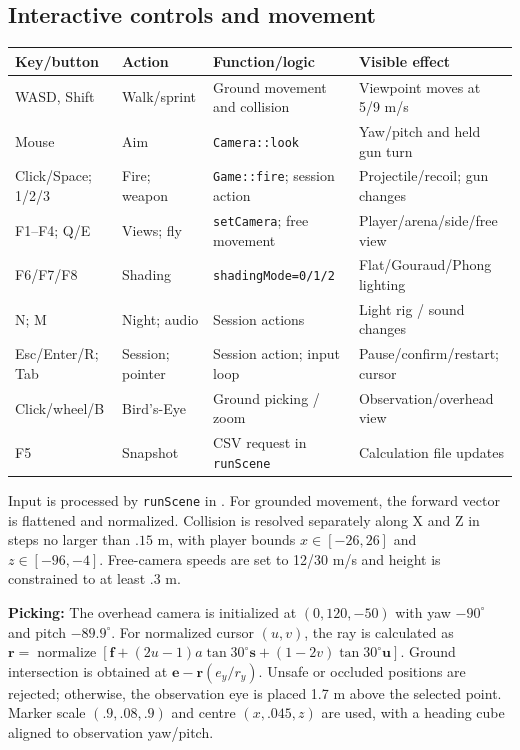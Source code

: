 \subsection{Interactive controls and movement}
\begin{center}\begin{tabularx}{\linewidth}{L{.17\linewidth}L{.17\linewidth}XX}\toprule
Key/button & Action & Function/logic & Visible effect \\\midrule
WASD, Shift & Walk/sprint & Ground movement and collision & Viewpoint moves at 5/9 m/s\\
Mouse & Aim & \texttt{Camera::look} & Yaw/pitch and held gun turn\\
Click/Space; 1/2/3 & Fire; weapon & \texttt{Game::fire}; session action & Projectile/recoil; gun changes\\
F1--F4; Q/E & Views; fly & \texttt{setCamera}; free movement & Player/arena/side/free view\\
F6/F7/F8 & Shading & \texttt{shadingMode=0/1/2} & Flat/Gouraud/Phong lighting\\
N; M & Night; audio & Session actions & Light rig / sound changes\\
Esc/Enter/R; Tab & Session; pointer & Session action; input loop & Pause/confirm/restart; cursor\\
Click/wheel/B & Bird's-Eye & Ground picking / zoom & Observation/overhead view\\
F5 & Snapshot & CSV request in \texttt{runScene} & Calculation file updates\\\bottomrule
\end{tabularx}\end{center}
Input is processed by \texttt{runScene} in . For grounded movement, the forward vector is flattened and normalized. Collision is resolved separately along X and Z in steps no larger than $.15$ m, with player bounds $x\in[-26,26]$ and $z\in[-96,-4]$. Free-camera speeds are set to 12/30 m/s and height is constrained to at least $.3$ m.

\textbf{Picking:} The overhead camera is initialized at $(0,120,-50)$ with yaw $-90^\circ$ and pitch $-89.9^\circ$. For normalized cursor $(u,v)$, the ray is calculated as $\mathbf r=\operatorname{normalize}[\mathbf f+(2u-1)a\tan30^\circ\mathbf s+(1-2v)\tan30^\circ\mathbf u]$. Ground intersection is obtained at $\mathbf e-\mathbf r(e_y/r_y)$. Unsafe or occluded positions are rejected; otherwise, the observation eye is placed 1.7 m above the selected point. Marker scale $(.9,.08,.9)$ and centre $(x,.045,z)$ are used, with a heading cube aligned to observation yaw/pitch.

